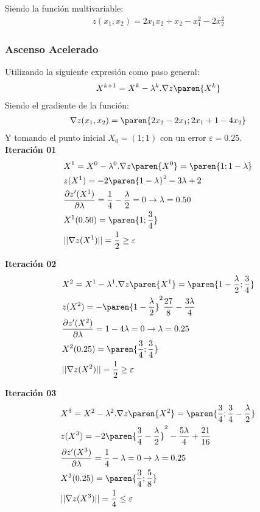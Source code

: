 \begin{homeworkProblem}
Siendo la función multivariable:
\begin{align*}
    z(x_1,x_2)=2x_1x_2+x_2-x_1^2-2x_2^2
\end{align*}

\subsubsection{Ascenso Acelerado}
Utilizando la siguiente expresión como paso general:
\begin{align*}
    X^{k+1}=X^k-\lambda^k.\nabla z\paren{X^k}
\end{align*} 
Siendo el gradiente de la función:
\begin{align*}
    \nabla z(x_1,x_2)=\paren{2x_2-2x_1;2x_1+1-4x_2}
\end{align*}
Y tomando el punto inicial $X_0=(1;1)$ con un error $\varepsilon=0.25$.\\

\textbf{Iteración 01}\\
\begin{align*}
    &X^{1}=X^0-\lambda^0.\nabla z\paren{X^0}=\paren{1;1-\lambda}\\
    &z(X^1)=-2\paren{1-\lambda}^2-3\lambda +2 \\
    &\frac{\partial z'(X^1) }{\partial \lambda}=
        \frac{1}{4}-\frac{\lambda}{2}= 0 
        \rightarrow \lambda = 0.50\\
    &X^1(0.50)=\paren{1;\frac{3}{4}}\\
    &||\nabla z(X^1)|| = \frac{1}{2} \geq \varepsilon
\end{align*}

\textbf{Iteración 02}\\
\begin{align*}
    &X^{2}=X^1-\lambda^1.\nabla z\paren{X^1}=\paren{1-\frac{\lambda}{2};\frac{3}{4}}\\
    &z(X^2)=-\paren{1-\frac{\lambda}{2}}^2\frac{27}{8} -\frac{3\lambda}{4} \\
    &\frac{\partial z'(X^2) }{\partial \lambda}=
        1-4\lambda= 0 
        \rightarrow \lambda = 0.25\\
    &X^2(0.25)=\paren{\frac{3}{4};\frac{3}{4}}\\
    &||\nabla z(X^2)|| = \frac{1}{2} \geq \varepsilon
\end{align*}


\textbf{Iteración 03}\\
\begin{align*}
    &X^3=X^2-\lambda^2.\nabla z\paren{X^2}=\paren{\frac{3}{4};\frac{3}{4} - \frac{\lambda}{2}}\\
    &z(X^3)=-2\paren{\frac{3}{4}-\frac{\lambda}{2}}^2
            -\frac{5\lambda}{4} + \frac{21}{16} \\
    &\frac{\partial z'(X^3) }{\partial \lambda}=
        \frac{1}{4}-\lambda= 0 
        \rightarrow \lambda = 0.25\\
    &X^3(0.25)=\paren{\frac{3}{4};\frac{5}{8}}\\
    &||\nabla z(X^3)|| = \frac{1}{4} \leq \varepsilon
\end{align*}


\end{homeworkProblem}

